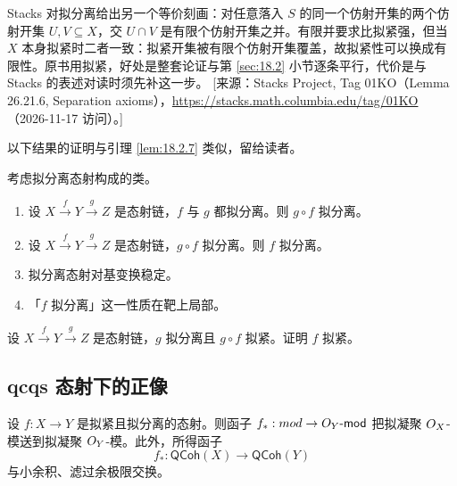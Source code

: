 \begin{yizhu}
Stacks 对拟分离给出另一个等价刻画：对任意落入 $S$ 的同一个仿射开集的两个仿射开集 $U,V\subseteq X$，交 $U\cap V$ 是有限个仿射开集之并。有限并要求比拟紧强，但当 $X$ 本身拟紧时二者一致：拟紧开集被有限个仿射开集覆盖，故拟紧性可以换成有限性。原书用拟紧，好处是整套论证与第 \ref{sec:18.2} 小节逐条平行，代价是与 Stacks 的表述对读时须先补这一步。
[来源：Stacks Project, Tag 01KO（Lemma 26.21.6, Separation axioms），\url{https://stacks.math.columbia.edu/tag/01KO}（2026-11-17 访问）。]
\end{yizhu}

以下结果的证明与引理 \ref{lem:18.2.7} 类似，留给读者。

\begin{lemma}\label{lem:18.3.4}
考虑拟分离态射构成的类。
\begin{enumerate}[label=(\roman*),leftmargin=2em,itemsep=0.25ex]
  \item 设 $X\xrightarrow{f}Y\xrightarrow{g}Z$ 是态射链，$f$ 与 $g$ 都拟分离。则 $g\circ f$ 拟分离。
  \item 设 $X\xrightarrow{f}Y\xrightarrow{g}Z$ 是态射链，$g\circ f$ 拟分离。则 $f$ 拟分离。
  \item 拟分离态射对基变换稳定。
  \item 「$f$ 拟分离」这一性质在靶上局部。
\end{enumerate}
\end{lemma}

\begin{exercise}\label{exc:18.3.5}
设 $X\xrightarrow{f}Y\xrightarrow{g}Z$ 是态射链，$g$ 拟分离且 $g\circ f$ 拟紧。证明 $f$ 拟紧。
\end{exercise}

\subsection{qcqs 态射下的正像}\label{sec:18.4}

\begin{theorem}\label{thm:18.4.1}
设 $f:X\to Y$ 是拟紧且拟分离的态射。则函子 $f_*:mod\to O_Y\text{-}\mathsf{mod}$ 把拟凝聚 $O_X$-模送到拟凝聚 $O_Y$-模。此外，所得函子
\[
f_*:\mathsf{QCoh}(X)\to\mathsf{QCoh}(Y)
\]
与小余积、滤过余极限交换。
\end{theorem}

